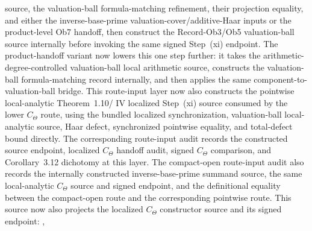 \begin{proposition}
  source, the valuation-ball formula-matching refinement, their projection
  equality, and either the inverse-base-prime valuation-cover/additive-Haar
  inputs or the product-level Ob7 handoff, then construct the Record-Ob3/Ob5
  valuation-ball source internally before invoking the same signed Step~(xi)
  endpoint.  The product-handoff variant
  now lowers this one step further: it takes the arithmetic-degree-controlled
  valuation-ball local arithmetic source, constructs the valuation-ball
  formula-matching record internally, and then applies the same
  component-to-valuation-ball bridge.
  This route-input layer now also constructs the pointwise local-analytic
  Theorem~1.10/\IUT{} IV localized Step~(xi) source consumed by the lower
  \(C_\Theta\) route, using the bundled localized synchronization,
  valuation-ball local-analytic source, Haar defect, synchronized pointwise
  equality, and total-defect bound directly.  The corresponding route-input
  audit
  records the constructed source endpoint, localized \(C_\Theta\) handoff
  audit, signed \(C_\Theta\) comparison, and Corollary~3.12 dichotomy at this
  layer.  The compact-open route-input audit
  also records the internally constructed inverse-base-prime summand source,
  the same local-analytic \(C_\Theta\) source and signed endpoint, and the
  definitional equality between the compact-open route and the corresponding
  pointwise route.  This source now also projects the localized \(C_\Theta\)
  constructor source and its signed endpoint:
  ,

\end{proposition}
